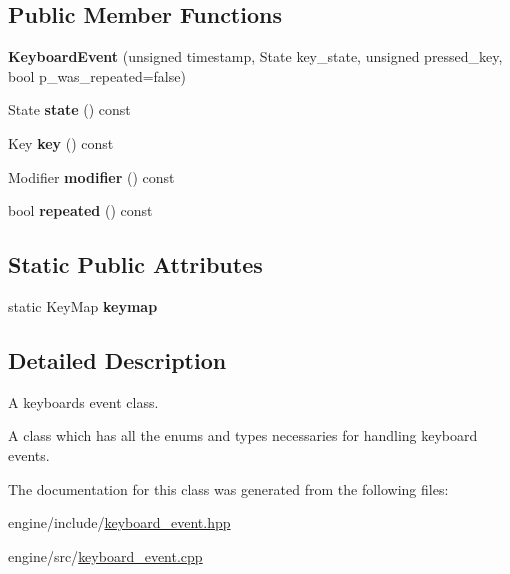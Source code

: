 \subsection*{Public Member Functions}
\begin{DoxyCompactItemize}
\item 
{\bfseries Keyboard\+Event} (unsigned timestamp, State key\+\_\+state, unsigned pressed\+\_\+key, bool p\+\_\+was\+\_\+repeated=false)\hypertarget{classengine_1_1_keyboard_event_a8bd39cffab6759c8f69dc97c1507e665}{}\label{classengine_1_1_keyboard_event_a8bd39cffab6759c8f69dc97c1507e665}

\item 
State {\bfseries state} () const \hypertarget{classengine_1_1_keyboard_event_adc94f8b7cb6434673f83d20cda27b105}{}\label{classengine_1_1_keyboard_event_adc94f8b7cb6434673f83d20cda27b105}

\item 
Key {\bfseries key} () const \hypertarget{classengine_1_1_keyboard_event_a1f6416f842f83dcc165e3aa4015d4da5}{}\label{classengine_1_1_keyboard_event_a1f6416f842f83dcc165e3aa4015d4da5}

\item 
Modifier {\bfseries modifier} () const \hypertarget{classengine_1_1_keyboard_event_aa9ce70b5b6abbb13665ed408c4e1e626}{}\label{classengine_1_1_keyboard_event_aa9ce70b5b6abbb13665ed408c4e1e626}

\item 
bool {\bfseries repeated} () const \hypertarget{classengine_1_1_keyboard_event_a4a9123104496071d5d1c1664bc0a7036}{}\label{classengine_1_1_keyboard_event_a4a9123104496071d5d1c1664bc0a7036}

\end{DoxyCompactItemize}
\subsection*{Static Public Attributes}
\begin{DoxyCompactItemize}
\item 
static Key\+Map {\bfseries keymap}\hypertarget{classengine_1_1_keyboard_event_a6e1cc1c7a3de88bd17d143001ef6bc7b}{}\label{classengine_1_1_keyboard_event_a6e1cc1c7a3de88bd17d143001ef6bc7b}

\end{DoxyCompactItemize}


\subsection{Detailed Description}
A keyboard\textquotesingle{}s event class. 

A class which has all the enums and types necessaries for handling keyboard events. 

The documentation for this class was generated from the following files\+:\begin{DoxyCompactItemize}
\item 
engine/include/\hyperlink{keyboard__event_8hpp}{keyboard\+\_\+event.\+hpp}\item 
engine/src/\hyperlink{keyboard__event_8cpp}{keyboard\+\_\+event.\+cpp}\end{DoxyCompactItemize}
